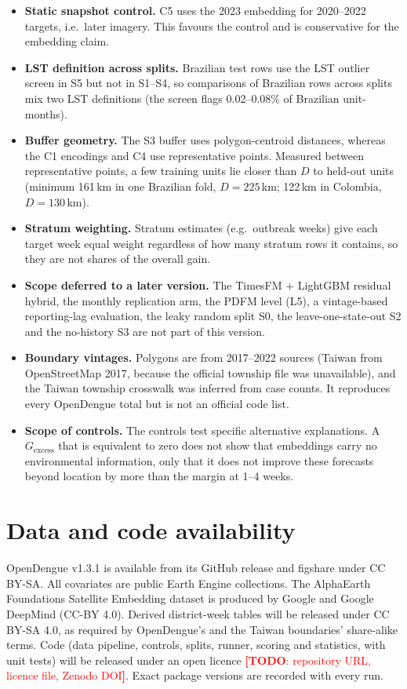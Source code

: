 \documentclass[11pt]{article}
\DeclareRobustCommand{\todo}[1]{\textcolor{red}{\textbf{[TODO}\if\relax\detokenize{#1}\relax\else: #1\fi\textbf{]}}}
\newcommand{\Gex}{G_{\mathrm{excess}}}
\begin{document}
\begin{itemize}
  Brazil, Peru and/or Taiwan S1 results had been seen (Appendix~\ref{app:deviations}). All were fixed
  before any spatial-split result was read.
  \item \textbf{Static snapshot control.} C5 uses the 2023 embedding for 2020--2022 targets, i.e.\ later
  imagery. This favours the control and is conservative for the embedding claim.
  \item \textbf{LST definition across splits.} Brazilian test rows use the LST outlier screen in S5 but
  not in S1--S4, so comparisons of Brazilian rows across splits mix two LST definitions (the screen flags
  0.02--0.08\% of Brazilian unit-months).
  \item \textbf{Buffer geometry.} The S3 buffer uses polygon-centroid distances, whereas the C1 encodings
  and C4 use representative points. Measured between representative points, a few training units lie
  closer than $D$ to held-out units (minimum 161\,km in one Brazilian fold, $D=225$\,km; 122\,km in
  Colombia, $D=130$\,km).
  \item \textbf{Stratum weighting.} Stratum estimates (e.g.\ outbreak weeks) give each target week equal
  weight regardless of how many stratum rows it contains, so they are not shares of the overall gain.
  \item \textbf{Scope deferred to a later version.} The TimesFM + LightGBM residual hybrid, the monthly
  replication arm, the PDFM level (L5), a vintage-based reporting-lag evaluation, the leaky random split S0,
  the leave-one-state-out S2 and the no-history S3 are not part of this version.
  \item \textbf{Boundary vintages.} Polygons are from 2017--2022 sources (Taiwan from OpenStreetMap 2017,
  because the official township file was unavailable), and the Taiwan township crosswalk was inferred
  from case counts. It reproduces every OpenDengue total but is not an official code list.
  \item \textbf{Scope of controls.} The controls test specific alternative explanations. A $\Gex$ that is
  equivalent to zero does not show that embeddings carry no environmental information, only that it does
  not improve these forecasts beyond location by more than the margin at 1--4 weeks.
\end{itemize}

\section*{Data and code availability}
OpenDengue v1.3.1 is available from its GitHub release and figshare \citep{opendengue131} under
CC BY-SA. All covariates are public Earth Engine collections. The AlphaEarth Foundations Satellite
Embedding dataset is produced by Google and Google DeepMind (CC-BY 4.0). Derived district-week tables
will be released under CC BY-SA 4.0, as required by OpenDengue's and the Taiwan boundaries' share-alike
terms. Code (data pipeline, controls, splits, runner, scoring and statistics, with unit tests) will be
released under an open licence \todo{repository URL, licence file, Zenodo DOI}. Exact package versions are
recorded with every run.
\end{document}
